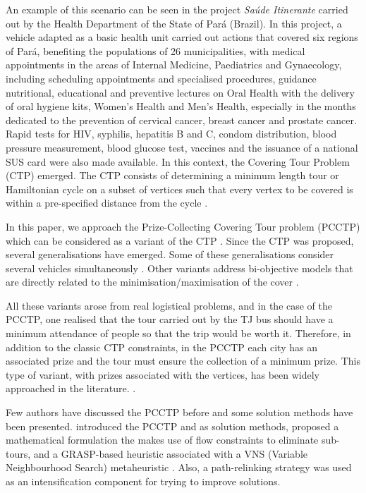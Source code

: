 \documentclass{singlecol-new}
\theoremstyle{TH}{
\newtheorem{lemma}{Lemma}
\newtheorem{theorem}[lemma]{Theorem}
\newtheorem{corrolary}[lemma]{Corrolary}
\newtheorem{conjecture}[lemma]{Conjecture}
\newtheorem{proposition}[lemma]{Proposition}
\newtheorem{claim}[lemma]{Claim}
\newtheorem{stheorem}[lemma]{Wrong Theorem}
}
\theoremstyle{THrm}{
\newtheorem{definition}{Definition}[section]
\newtheorem{question}{Question}[section]
\newtheorem{remark}{Remark}
\newtheorem{scheme}{Scheme}
}
\theoremstyle{THhit}{
\newtheorem{case}{Case}[section]
}
\begin{document}
An example of this scenario can be seen in the project \textit{Saúde Itinerante} carried out by the Health Department of the State of Pará (Brazil).  In this project, a vehicle adapted as a basic health unit carried out actions that covered six regions of Pará, benefiting the populations of 26 municipalities, with medical appointments in the areas of Internal Medicine, Paediatrics and Gynaecology, including scheduling appointments and specialised procedures, guidance nutritional, educational and preventive lectures on Oral Health with the delivery of oral hygiene kits, Women's Health and Men's Health, especially in the months dedicated to the prevention of cervical cancer, breast cancer and prostate cancer. Rapid tests for HIV, syphilis, hepatitis B and C, condom distribution, blood pressure measurement, blood glucose test, vaccines and the issuance of a national SUS card were also made available. In this context, the Covering Tour Problem (CTP) emerged. The CTP consists of determining a minimum length tour or Hamiltonian cycle on a subset of vertices such that every vertex to be covered is within a pre-specified distance from the cycle \citep{gendreau1997covering}.

In this paper, we  approach the Prize-Collecting Covering Tour problem (PCCTP) which can be considered as a variant of the CTP \citep{gendreau1997covering}. Since the CTP was proposed, several generalisations have emerged. Some of these generalisations consider several vehicles simultaneously  \citep{karimi2018capacitated, murakami2018iterative, margolis2021multi, karaouglan2018multi, glize2020exact, kammoun2020two}. Other variants address bi-objective models  that are directly related to the minimisation/maximisation of the cover \citep{artigues2018column,ebrahimi2012maximal,tricoire2012bi, zehetner2018sampling}.

All these variants arose from real logistical problems, and in the case of the PCCTP, one realised that the tour carried out by the TJ bus should have a minimum attendance of people so that the trip would be worth it. Therefore, in addition to the classic CTP constraints, in the PCCTP each city has an associated prize and the tour must ensure the collection of a minimum prize. This type of variant, with prizes associated with the vertices, has been widely approached in the literature. \citep{berube2009branch, trachanatzi2020firefly, canuto2001local}.

Few authors have discussed the PCCTP before and some solution methods have been presented. \citep{lyra2004problema} introduced the PCCTP and as solution methods, proposed a mathematical formulation the makes use of flow constraints to eliminate sub-tours, and a GRASP-based heuristic  \citep{grasp03}   associated with a VNS (Variable Neighbourhood Search) metaheuristic \citep{mladenovic97}.  Also, a path-relinking strategy was used as an intensification component for trying to improve solutions.
\end{document}
